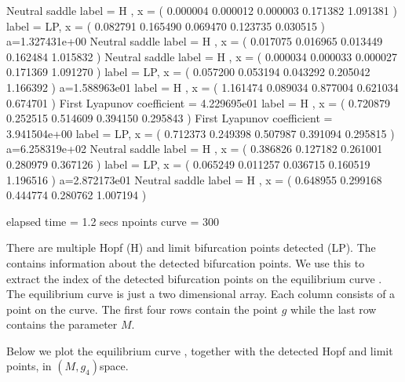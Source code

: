 \documentclass[letterpaper,10pt,english]{jupyterBook}
\begin{document}
\begin{sphinxVerbatim}[commandchars=\\\{\}]
Neutral saddle
label = H , x = ( 0.000004 \PYGZhy{}0.000012 \PYGZhy{}0.000003 \PYGZhy{}0.171382 1.091381 )
label = LP, x = ( 0.082791 \PYGZhy{}0.165490 \PYGZhy{}0.069470 \PYGZhy{}0.123735 0.030515 )
a=1.327431e+00
Neutral saddle
label = H , x = ( 0.017075 \PYGZhy{}0.016965 \PYGZhy{}0.013449 \PYGZhy{}0.162484 1.015832 )
Neutral saddle
label = H , x = ( 0.000034 \PYGZhy{}0.000033 \PYGZhy{}0.000027 \PYGZhy{}0.171369 1.091270 )
label = LP, x = ( \PYGZhy{}0.057200 0.053194 0.043292 \PYGZhy{}0.205042 1.166392 )
a=1.588963e\PYGZhy{}01
label = H , x = ( \PYGZhy{}1.161474 \PYGZhy{}0.089034 0.877004 \PYGZhy{}0.621034 0.674701 )
First Lyapunov coefficient = 4.229695e\PYGZhy{}01
label = H , x = ( \PYGZhy{}0.720879 \PYGZhy{}0.252515 0.514609 \PYGZhy{}0.394150 0.295843 )
First Lyapunov coefficient = \PYGZhy{}3.941504e+00
label = LP, x = ( \PYGZhy{}0.712373 \PYGZhy{}0.249398 0.507987 \PYGZhy{}0.391094 0.295815 )
a=\PYGZhy{}6.258319e+02
Neutral saddle
label = H , x = ( \PYGZhy{}0.386826 \PYGZhy{}0.127182 0.261001 \PYGZhy{}0.280979 0.367126 )
label = LP, x = ( 0.065249 0.011257 \PYGZhy{}0.036715 \PYGZhy{}0.160519 1.196516 )
a=\PYGZhy{}2.872173e\PYGZhy{}01
Neutral saddle
label = H , x = ( 0.648955 0.299168 \PYGZhy{}0.444774 \PYGZhy{}0.280762 \PYGZhy{}1.007194 )

elapsed time  = 1.2 secs
npoints curve = 300
\end{sphinxVerbatim}

\sphinxAtStartPar
There are multiple Hopf (H) and limit bifurcation points detected (LP). The 
 contains information about the detected bifurcation points. We
use this to extract the index of the detected bifurcation points on the
equilibrium curve . The equilibrium curve  is just a two
dimensional array. Each column consists of a point on the curve. The first four
rows contain the point \(g\) while the last row contains the parameter \(M\).

\sphinxAtStartPar
Below we plot the equilibrium curve , together with the detected Hopf and limit
points, in \((M,g_4)\)\sphinxhyphen{}space.
\end{document}
